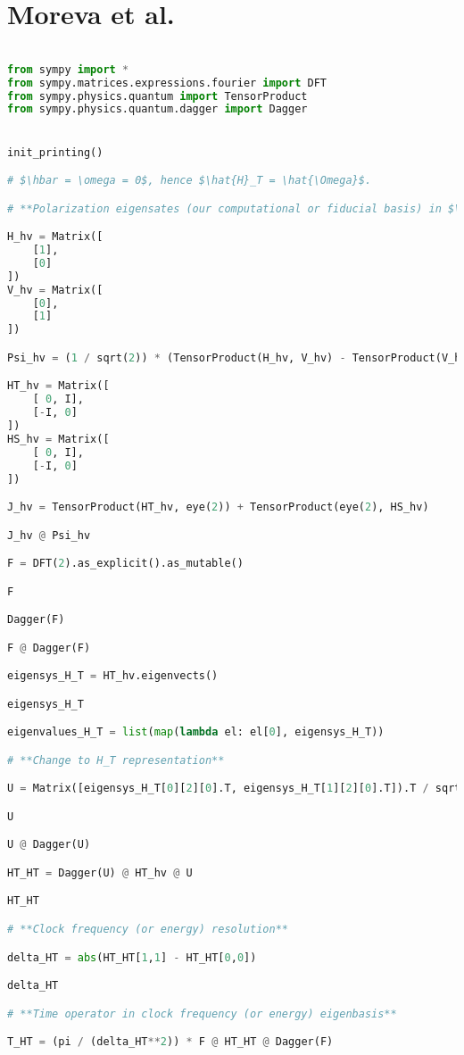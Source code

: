 \section{Moreva et al.}

\begin{lstlisting}[language=Python]

from sympy import *
from sympy.matrices.expressions.fourier import DFT
from sympy.physics.quantum import TensorProduct
from sympy.physics.quantum.dagger import Dagger


init_printing()

# $\hbar = \omega = 0$, hence $\hat{H}_T = \hat{\Omega}$.

# **Polarization eigensates (our computational or fiducial basis) in $\mathcal{H}_T$**

H_hv = Matrix([
    [1],
    [0]
])
V_hv = Matrix([
    [0],
    [1]
])

Psi_hv = (1 / sqrt(2)) * (TensorProduct(H_hv, V_hv) - TensorProduct(V_hv, H_hv))

HT_hv = Matrix([
    [ 0, I],
    [-I, 0]
])
HS_hv = Matrix([
    [ 0, I],
    [-I, 0]
])

J_hv = TensorProduct(HT_hv, eye(2)) + TensorProduct(eye(2), HS_hv)

J_hv @ Psi_hv

F = DFT(2).as_explicit().as_mutable()

F

Dagger(F)

F @ Dagger(F)

eigensys_H_T = HT_hv.eigenvects()

eigensys_H_T

eigenvalues_H_T = list(map(lambda el: el[0], eigensys_H_T))

# **Change to H_T representation**

U = Matrix([eigensys_H_T[0][2][0].T, eigensys_H_T[1][2][0].T]).T / sqrt(2)

U

U @ Dagger(U)

HT_HT = Dagger(U) @ HT_hv @ U

HT_HT

# **Clock frequency (or energy) resolution**

delta_HT = abs(HT_HT[1,1] - HT_HT[0,0])

delta_HT

# **Time operator in clock frequency (or energy) eigenbasis**

T_HT = (pi / (delta_HT**2)) * F @ HT_HT @ Dagger(F) 


\end{lstlisting}
